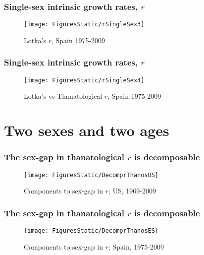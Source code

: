 \documentclass{beamer}
\begin{document}
\begin{frame}
\frametitle{Single-sex intrinsic growth rates, $r$}
\vspace{-2em}
\begin{figure}
      \centering
      \caption*{Lotka's $r$, Spain 1975-2009}
      \texttt{[image: FiguresStatic/rSingleSex3]}
\end{figure}
\end{frame}

\begin{frame}
\frametitle{Single-sex intrinsic growth rates, $r$}
\vspace{-2em}
\begin{figure}
      \centering
      \caption*{Lotka's vs Thanatological $r$, Spain 1975-2009}
      \texttt{[image: FiguresStatic/rSingleSex4]}
\end{figure}
\end{frame}

\section{Two sexes and two ages}


\begin{frame}
  \frametitle{The sex-gap in thanatological $r$ is decomposable}
  \vspace{-2em}
\begin{figure}
\centering
\caption*{Components to sex-gap in $r$; US, 1969-2009}
\texttt{[image: FiguresStatic/DecomprThanosUS]}
\end{figure}
\end{frame}


\begin{frame}
  \frametitle{The sex-gap in thanatological $r$ is decomposable}
  \vspace{-2em}
\begin{figure}
\centering
\caption*{Components to sex-gap in $r$; Spain, 1975-2009}
\texttt{[image: FiguresStatic/DecomprThanosES]}
\end{figure}
\end{frame}

\end{document}
